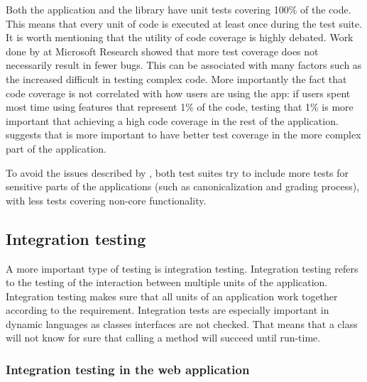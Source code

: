Both the application and the library have unit tests covering 100\% of the code. This means that every unit of code is executed at least once during the test suite. It is worth mentioning that the utility of code coverage is highly debated. Work done by \cite{msft_testing} at Microsoft Research showed that more test coverage does not necessarily result in fewer bugs. This can be associated with many factors such as the increased difficult in testing complex code. More importantly the fact that code coverage is not correlated with how users are using the app: if users spent most time using features that represent 1\% of the code, testing that 1\% is more important that achieving a high code coverage in the rest of the application. \cite{msft_testing} suggests that is more important to have better test coverage in the more complex part of the application.

To avoid the issues described by \cite{msft_testing}, both test suites try to include more tests for sensitive parts of the applications (such as canonicalization and grading process), with less tests covering non-core functionality. 

\subsection{Integration testing}

A more important type of testing is integration testing. Integration testing refers to the testing of the interaction between multiple units of the application. Integration testing makes sure that all units of an application work together according to the requirement. Integration tests are especially important in dynamic languages as classes interfaces are not checked. That means that a class will not know for sure that calling a method will succeed until run-time.

\subsubsection{Integration testing in the web application}

